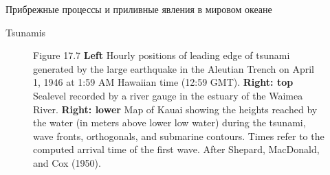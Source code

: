 \begin{chapter}{Прибрежные процессы и приливные явления в мировом океане}
\begin{section}{Tsunamis}
\begin{figure}[t!]
\caption{Figure 17.7 \textbf{Left} Hourly positions of leading
edge of tsunami generated by the large
earthquake in the Aleutian Trench on April 1, 1946 at 1:59 AM Hawaiian
time (12:59 GMT).  \textbf{Right: top} Sealevel recorded by a river
gauge in the estuary of the Waimea River.  \textbf{Right: lower} Map
of Kauai showing the heights reached by the water (in meters above
lower low water) during the tsunami, wave fronts, orthogonals, and
submarine contours. Times refer to the computed arrival time of the
first wave. After Shepard, MacDonald, and Cox (1950).}
\label{fig:tsunami}
\end{figure}
%


\end{section}
\end{chapter}

